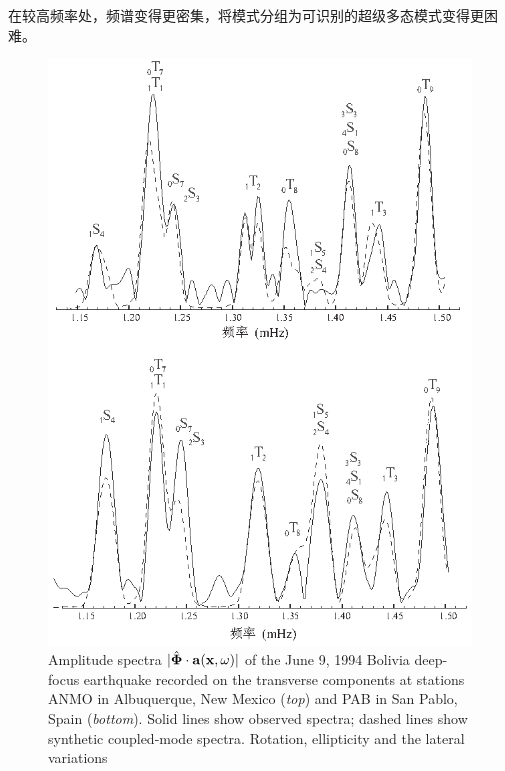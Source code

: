 在较高频率处，频谱变得更密集，将模式分组为可识别的超级多态模式变得更困难。
\begin{figure}[!t]
\begin{center}
\includegraphics{../figures/chap14/fig26.eps}
\end{center}
\caption[trans_specs]{\label{fig:14.trans_specs}
\iffalse
Amplitude spectra $|\hat{\bf \Phi}\cdot{\bf a}({\bf x},\omega)|$
of the June 9, 1994 Bolivia deep-focus earthquake recorded
on the transverse components at stations ANMO in
Albuquerque, New Mexico ({\em  top}) and PAB
in San Pablo, Spain ({\em  bottom}).   Solid lines show
observed spectra; dashed lines show synthetic coupled-mode
spectra.  Rotation, ellipticity and the lateral variations
}
\end{figure}
